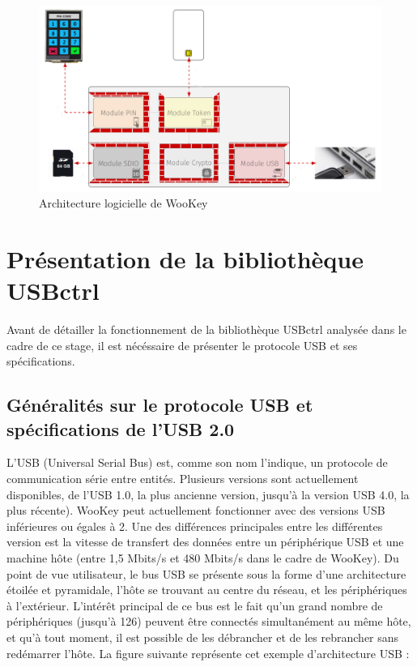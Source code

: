\begin{figure}[!h]
\centering
\includegraphics[width=16cm]{images/architecture_wookey.png}
\caption{Architecture logicielle de WooKey}
\label{Architecture logicielle de WooKey}
\end{figure}

\section{Présentation de la bibliothèque USBctrl}\label{USBctrl}

Avant de détailler la fonctionnement de la bibliothèque USBctrl analysée dans le cadre de ce stage, il est nécéssaire de présenter le protocole USB et ses spécifications.

\subsection{Généralités sur le protocole USB et spécifications de l'USB 2.0}

L'USB (Universal Serial Bus) est, comme son nom l'indique, un protocole de communication série entre entités. Plusieurs versions sont actuellement disponibles, de l'USB 1.0, la plus ancienne version, jusqu'à la version USB 4.0, la plus récente). WooKey peut actuellement fonctionner avec des versions USB inférieures ou égales à 2. Une des différences principales entre les différentes version est la vitesse de transfert des données entre un périphérique USB et une machine hôte (entre 1,5 Mbits/s et 480 Mbits/s dans le cadre de WooKey).
\newline
\noindent Du point de vue utilisateur, le bus USB se présente sous la forme d'une architecture étoilée et pyramidale, l'hôte se trouvant au centre du réseau, et les périphériques à l'extérieur. L'intérêt principal de ce bus est le fait qu'un grand nombre de périphériques (jusqu'à 126) peuvent être connectés simultanément au même hôte, et qu'à tout moment, il est possible de les débrancher et de les rebrancher sans redémarrer l'hôte. La figure suivante représente cet exemple d'architecture USB :


